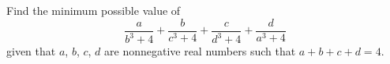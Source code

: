 Find the minimum possible value of \[\frac{a}{b^3+4}+\frac{b}{c^3+4}+\frac{c}{d^3+4}+\frac{d}{a^3+4}\]given that $a$,  $b$,  $c$,  $d$ are nonnegative real numbers such that $a+b+c+d=4$.
